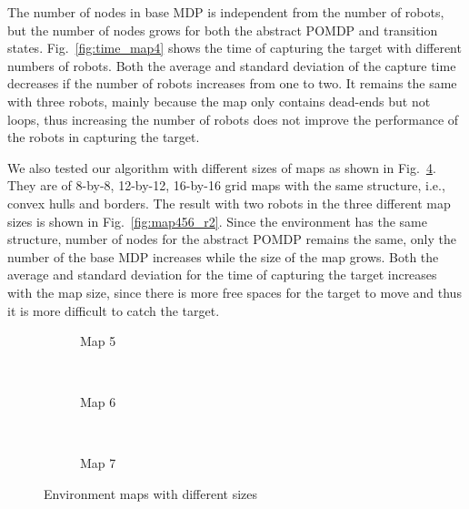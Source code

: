\documentclass[../main.tex]{subfiles}
\begin{document}
The number of nodes in base MDP is independent from the number of robots, but the number of nodes grows for both the abstract POMDP and transition states. Fig.~\ref{fig:time_map4} shows the time of capturing the target with different numbers of robots. Both the average and standard deviation of the capture time decreases if the number of robots increases from one to two. It remains the same with three robots, mainly because the map only contains dead-ends but not loops, thus increasing the number of robots does not improve the performance of the robots in capturing the target. 

We also tested our algorithm with different sizes of maps as shown in Fig.~\ref{fig:env_map_size}. They are of 8-by-8, 12-by-12, 16-by-16 grid maps with the same structure, i.e., convex hulls and borders. The result with two robots in the three different map sizes is shown in Fig.~\ref{fig:map456_r2}. Since the environment has the same structure, number of nodes for the abstract POMDP remains the same, only the number of the base MDP increases while the size of the map grows. Both the average and standard deviation for the time of capturing the target increases with the map size, since there is more free spaces for the target to move and thus it is more difficult to catch the target.

\begin{figure}
\captionsetup{skip=0pt}
    \centering
    \begin{subfigure}[b]{0.28\textwidth}
        \centering
        \caption{Map 5}
        \label{fig:map5}
    \end{subfigure}\
    \begin{subfigure}[b]{0.28\textwidth}
        \centering
        \caption{Map 6}
        \label{fig:map6}
    \end{subfigure}\
    \begin{subfigure}[b]{0.28\textwidth}
        \centering
        \caption{Map 7}
        \label{fig:map7}
    \end{subfigure}
    \caption{Environment maps with different sizes}
    \label{fig:env_map_size}%
\end{figure}
\end{document}
